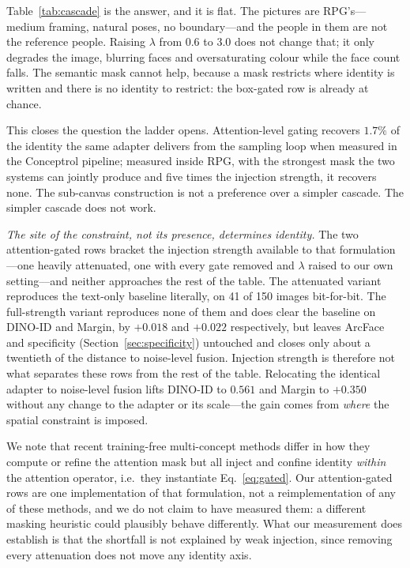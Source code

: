 \documentclass[review,10pt,times]{elsarticle}
\begin{document}
Table~\ref{tab:cascade} is the answer, and it is flat.  The pictures are
RPG's---medium framing, natural poses, no boundary---and the people in them
are not the reference people.  Raising $\lambda$ from $0.6$ to $3.0$ does not
change that; it only degrades the image, blurring faces and oversaturating
colour while the face count falls.  The semantic mask cannot help, because a
mask restricts where identity is written and there is no identity to restrict:
the box-gated row is already at chance.

This closes the question the ladder opens.  Attention-level gating recovers
$1.7\%$ of the identity the same adapter delivers from the sampling loop when
measured in the Conceptrol pipeline; measured inside RPG, with the strongest
mask the two systems can jointly produce and five times the injection
strength, it recovers none.  The sub-canvas construction is not a preference
over a simpler cascade.  The simpler cascade does not work.

\noindent\textit{The site of the constraint, not its presence,
determines identity.}
The two attention-gated rows bracket the injection strength available to
that formulation---one heavily attenuated, one with every gate removed
and $\lambda$ raised to our own setting---and neither approaches the rest
of the table.  The attenuated variant reproduces the text-only baseline
literally, on 41 of 150 images bit-for-bit.  The full-strength variant
reproduces none of them and does clear the baseline on DINO-ID and Margin,
by $+0.018$ and $+0.022$ respectively, but leaves ArcFace and specificity
(Section~\ref{sec:specificity}) untouched and closes only about a
twentieth of the distance to noise-level fusion.  Injection strength is
therefore not what separates these rows from the rest of the table.  Relocating the identical adapter to
noise-level fusion lifts DINO-ID to $0.561$ and Margin to $+0.350$
without any change to the adapter or its scale---the gain comes from
\emph{where} the spatial constraint is imposed.

We note that recent training-free multi-concept methods
\cite{he2025conceptrol,mc2_2025,latexblend2025,freecustom2024,yu2025anyms}
differ in how they compute or refine the attention mask but all inject
and confine identity \emph{within} the attention operator, i.e.\ they
instantiate Eq.~\ref{eq:gated}.  Our attention-gated rows are one
implementation of that formulation, not a reimplementation of any of
these methods, and we do not claim to have measured them: a different
masking heuristic could plausibly behave differently.  What our
measurement does establish is that the shortfall is not explained by
weak injection, since removing every attenuation does not move any
identity axis.
\end{document}
